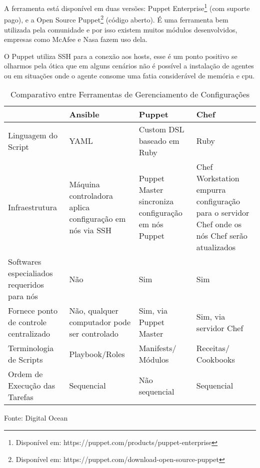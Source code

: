 A ferramenta está disponível em duas versões: Puppet Enterprise\footnote{Disponível em: https://puppet.com/products/puppet-enterprise} (com suporte pago), e a Open Source Puppet\footnote{Disponível em: https://puppet.com/download-open-source-puppet} (código aberto). É uma ferramenta bem utilizada pela comunidade e por isso existem muitos módulos desenvolvidos, empresas como McAfee e Nasa fazem uso dela.

O Puppet utiliza SSH para a conexão aos hosts, esse é um ponto positivo se olharmos pela ótica que em alguns cenários não é possível a instalação de agentes ou em situações onde o agente consome uma fatia considerável de memória e cpu.

\begin{table}[h]
	\centering

	\begin{tabular}{|p{3.0cm}|p{3.0cm}|p{3.0cm}|p{3.0cm}|}
		\cline{1-4}
		
		  & Ansible &Puppet & Chef \\ %
		\hline                               %
		Linguagem do Script & YAML        & Custom DSL baseado em Ruby & Ruby\\ \cline{1-4}
		
		Infraestrutura & Máquina controladora aplica configuração em nós via SSH  & Puppet Master sincroniza configuração em nós Puppet & Chef Workstation empurra configuração para o servidor Chef onde os nós Chef serão atualizados  \\ \cline{1-4}
		
		Softwares especialiados requeridos para nós & Não & Sim & Sim\\ \cline{1-4}
		
		Fornece ponto de controle centralizado & Não, qualquer computador pode ser controlado &  Sim, via  Puppet Master & Sim, via servidor Chef \\ \cline{1-4}
		
		Terminologia de Scripts & Playbook/Roles & Manifests/ Módulos & Receitas/ Cookbooks \\ \cline{1-4}
		
		Ordem de Execução das Tarefas & Sequencial & Não sequencial & Sequencial \\ \cline{1-4}         
		
	\end{tabular}
	\caption{Comparativo entre Ferramentas de Gerenciamento de Configurações}
	Fonte: Digital Ocean\footnotemark
\end{table}


